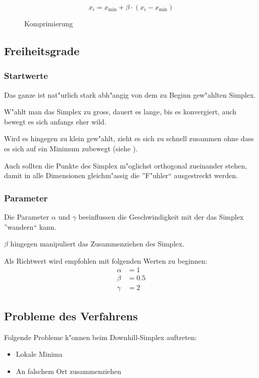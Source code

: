 \begin{equation}
x_{i} = x_{\text{min}} + \beta \cdot (x_i - x_{\text{min}}) 
\end{equation}

\begin{figure}[ht]
	\centering
  	\caption{Komprimierung}%
	\label{fig:komp}%
\end{figure}

\subsection{Freiheitsgrade}
\subsubsection{Startwerte}
Das ganze ist nat"urlich stark abh"angig von dem zu Beginn gew"ahlten Simplex.

W"ahlt man das Simplex zu gross, dauert es lange, bis es konvergiert,
auch bewegt es sich anfangs eher wild.

Wird es hingegen zu klein gew"ahlt, zieht es sich zu schnell
zusammen ohne dass es sich auf ein Minimum zubewegt (siehe
).

Auch sollten die Punkte des Simplex m"oglichst orthogonal zueinander
stehen, damit in alle Dimensionen gleichm"assig die ''F"uhler``
ausgestreckt werden.

\subsubsection{Parameter}
Die Parameter $\alpha$ und $\gamma$ beeinflussen die Geschwindigkeit
mit der das Simplex ''wandern`` kann.

$\beta$ hingegen manipuliert das Zusammenziehen des Simplex.

Als Richtwert wird empfohlen mit folgenden Werten zu beginnen:
\begin{align*}
\alpha &= 1 \\
\beta &= 0.5 \\
\gamma &= 2
\end{align*}

\subsection{Probleme des Verfahrens}
Folgende Probleme k"onnen beim Downhill-Simplex auftreten:
\begin{itemize}
\item Lokale Minima
\item An falschem Ort zusammenziehen
\end{itemize}

